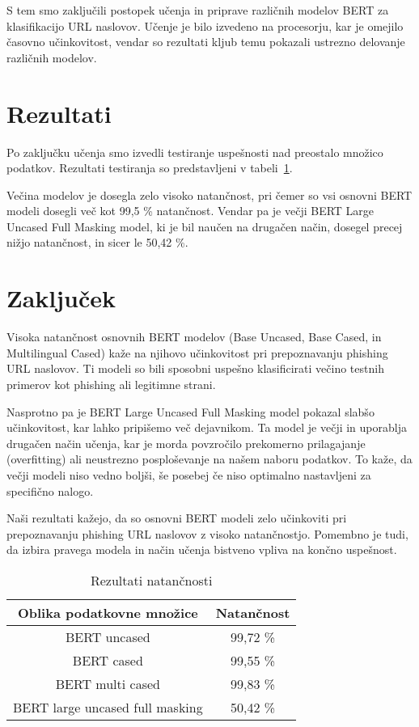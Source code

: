 \documentclass[sigconf,nonacm]{acmart}
\begin{document}
S tem smo zaključili postopek učenja in priprave različnih modelov BERT za klasifikacijo URL naslovov. Učenje je bilo izvedeno na procesorju, kar je omejilo časovno učinkovitost, vendar so rezultati kljub temu pokazali ustrezno delovanje različnih modelov.

\section{Rezultati}
Po zaključku učenja smo izvedli testiranje uspešnosti nad preostalo množico podatkov. Rezultati testiranja so predstavljeni v tabeli~\ref{tab:table2}. 

Večina modelov je dosegla zelo visoko natančnost, pri čemer so vsi osnovni BERT modeli dosegli več kot 99,5 \% natančnost. Vendar pa je večji BERT Large Uncased Full Masking model, ki je bil naučen na drugačen način, dosegel precej nižjo natančnost, in sicer le 50,42 \%.

\section{Zaključek}
Visoka natančnost osnovnih BERT modelov (Base Uncased, Base Cased, in Multilingual Cased) kaže na njihovo učinkovitost pri prepoznavanju phishing URL naslovov. Ti modeli so bili sposobni uspešno klasificirati večino testnih primerov kot phishing ali legitimne strani.

Nasprotno pa je BERT Large Uncased Full Masking model pokazal slabšo učinkovitost, kar lahko pripišemo več dejavnikom. Ta model je večji in uporablja drugačen način učenja, kar je morda povzročilo prekomerno prilagajanje (overfitting) ali neustrezno posploševanje na našem naboru podatkov. To kaže, da večji modeli niso vedno boljši, še posebej če niso optimalno nastavljeni za specifično nalogo.

Naši rezultati kažejo, da so osnovni BERT modeli zelo učinkoviti pri prepoznavanju phishing URL naslovov z visoko natančnostjo. Pomembno je tudi, da izbira pravega modela in način učenja bistveno vpliva na končno uspešnost.

\begin{table}
    \centering
    \caption{Rezultati natančnosti}
    \label{tab:table2}
    \begin{tabular}{cc}
        	\toprule
        	Oblika podatkovne množice&Natančnost\\
       	 \midrule
        	BERT uncased & 99,72 \% \\
       	BERT cased &  99,55 \%  \\
	BERT multi cased & 99,83 \% \\
	BERT large uncased full masking  &  50,42 \% \\
       	 \bottomrule
    \end{tabular}
\end{table}



\end{document}
